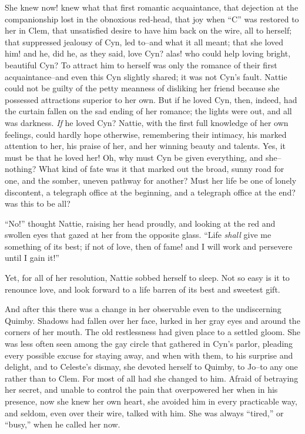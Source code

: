 She knew now! knew what that first romantic acquaintance, that dejection
at the companionship lost in the obnoxious red-head, that joy when ``C''
was restored to her in Clem, that unsatisfied desire to have him back on
the wire, all to herself; that suppressed jealousy of Cyn, led to--and
what it all meant; that she loved him! and he, did he, as they said,
love Cyn? alas! who could help loving bright, beautiful Cyn? To attract
him to herself was only the romance of their first acquaintance--and
even this Cyn slightly shared; it was not Cyn's fault. Nattie could not
be guilty of the petty meanness of disliking her friend because she
possessed attractions superior to her own. But if he loved Cyn, then,
indeed, had the curtain fallen on the sad ending of her romance; the
lights were out, and all was darkness. \emph{If} he loved Cyn? Nattie, with the
first full knowledge of her own feelings, could hardly hope otherwise,
remembering their intimacy, his marked attention to her, his praise of
her, and her winning beauty and talents. Yes, it must be that he loved
her! Oh, why must Cyn be given everything, and she--nothing? What kind
of fate was it that marked out the broad, sunny road for one, and the
somber, uneven pathway for another? Must her life be one of lonely
discontent, a telegraph office at the beginning, and a telegraph office
at the end? was this to be all?

``No!'' thought Nattie, raising her head proudly, and looking at the red
and swollen eyes that gazed at her from the opposite glass. ``Life \emph{shall}
give me something of its best; if not of love, then of fame! and I will
work and persevere until I gain it!''

Yet, for all of her resolution, Nattie sobbed herself to sleep. Not so
easy is it to renounce love, and look forward to a life barren of its
best and sweetest gift.

And after this there was a change in her observable even to the
undiscerning Quimby. Shadows had fallen over her face, lurked in her
gray eyes and around the corners of her mouth. The old restlessness had
given place to a settled gloom. She was less often seen among the gay
circle that gathered in Cyn's parlor, pleading every possible excuse for
staying away, and when with them, to his surprise and delight, and to
Celeste's dismay, she devoted herself to Quimby, to Jo--to any one
rather than to Clem. For most of all had she changed to him. Afraid of
betraying her secret, and unable to control the pain that overpowered
her when in his presence, now she knew her own heart, she avoided him in
every practicable way, and seldom, even over their wire, talked with
him. She was always ``tired,'' or ``busy,'' when he called her now.

